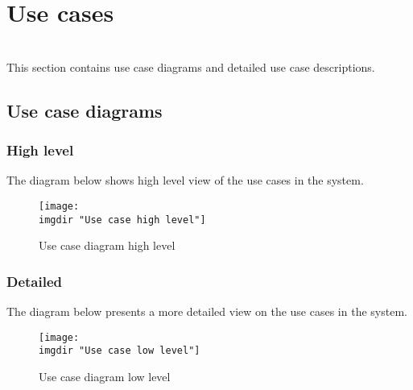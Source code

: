 \section{Use cases} \martin \pawel \\
This section contains use case diagrams and detailed use case descriptions.

\subsection{Use case diagrams}
\subsubsection{High level}
The diagram below shows high level view of the use cases in the system. 
\begin{figure}[H]
\texttt{[image: \\imgdir "Use case high level"]}
\centering
\caption{Use case diagram high level}
\label{fig:use_case_high_level}
\end{figure}

\subsubsection{Detailed}
The diagram below presents a more detailed view on the use cases in the system.
\begin{figure}[H]
\texttt{[image: \\imgdir "Use case low level"]}
\centering
\caption{Use case diagram low level}
\label{fig:use_case_low_level}
\end{figure}

